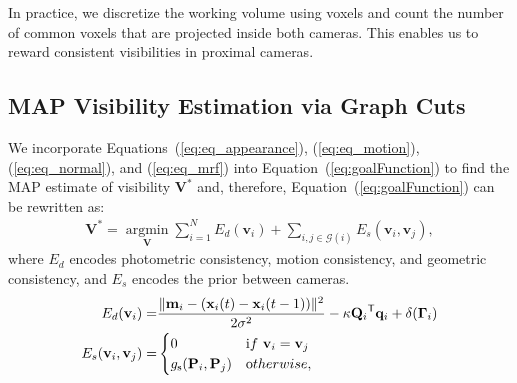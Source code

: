 
In practice, we discretize the working volume using voxels and count the number of common voxels that are projected inside both cameras. This enables us to reward consistent visibilities in proximal cameras. %

\subsection{MAP Visibility Estimation via Graph Cuts\label{sub:graphcuts}} 
We incorporate Equations~(\ref{eq:eq_appearance}), (\ref{eq:eq_motion}), (\ref{eq:eq_normal}), and (\ref{eq:eq_mrf}) into Equation~(\ref{eq:goalFunction}) to find the MAP estimate of visibility $\mathbf{V^*}$ and, therefore, Equation~(\ref{eq:goalFunction}) can be rewritten as:
\begin{eqnarray}
\mathbf{V^*} = \underset{\mathbf{V}}{\operatorname{argmin}}  \sum_{i=1}^{N} E_d( \mathbf{v}_i) + \sum_{ i, j \in \mathcal{G}(i) } E_s (\mathbf{v}_i,\mathbf{v}_j),
\end{eqnarray}
where $E_d$ encodes photometric consistency, motion consistency, and geometric consistency, and $E_s$ encodes the prior between cameras. 
\begin{eqnarray}
E_d(\mathbf{v}_i) =& \frac{\| \mathbf{m}_i - ( \mathbf{x}_i(t) - \mathbf{x}_i(t-1) )  \|^2} {2\sigma^2} -\kappa {\mathbf{Q}_i}^\mathsf{T} \mathbf{q}_i + \delta(\bm{\Gamma}_i ) \nonumber\\
E_s(\mathbf{v}_i,\mathbf{v}_j) =& \begin{cases} 0 & {\textrm if~} \mathbf{v}_i=\mathbf{v}_j  \nonumber\\                                                             
g_\textrm{s}(\mathbf{P}_i,\mathbf{P}_j) & {\textrm otherwise,}\end{cases} 
\end{eqnarray}
